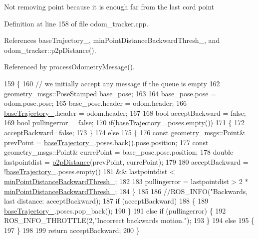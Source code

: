 Not removing point because it is enough far from the last cord point 

Definition at line 158 of file odom\+\_\+tracker.\+cpp.



References base\+Trajectory\+\_\+, min\+Point\+Distance\+Backward\+Thresh\+\_\+, and odom\+\_\+tracker\+::p2p\+Distance().



Referenced by process\+Odometry\+Message().


\begin{DoxyCode}
159 \{
160     \textcolor{comment}{// we initially accept any message if the queue is empty   }
162 \textcolor{comment}{}    geometry\_msgs::PoseStamped base\_pose;
163     
164     base\_pose.pose = odom.pose.pose;
165     base\_pose.header = odom.header;
166     \hyperlink{classodom__tracker_1_1OdomTracker_a889adca220c33056d9a582eceda64adc}{baseTrajectory\_}.header = odom.header;
167 
168     \textcolor{keywordtype}{bool} acceptBackward = \textcolor{keyword}{false};
169     \textcolor{keywordtype}{bool} pullingerror = \textcolor{keyword}{false};
170     \textcolor{keywordflow}{if}(\hyperlink{classodom__tracker_1_1OdomTracker_a889adca220c33056d9a582eceda64adc}{baseTrajectory\_}.poses.empty())
171     \{
172         acceptBackward=\textcolor{keyword}{false};
173     \}
174     \textcolor{keywordflow}{else}
175     \{
176         \textcolor{keyword}{const} geometry\_msgs::Point& prevPoint = \hyperlink{classodom__tracker_1_1OdomTracker_a889adca220c33056d9a582eceda64adc}{baseTrajectory\_}.poses.back().pose.position;
177         \textcolor{keyword}{const} geometry\_msgs::Point& currePoint = base\_pose.pose.position;
178         \textcolor{keywordtype}{double} lastpointdist = \hyperlink{namespaceodom__tracker_a18caccd20c7915e29706a95860e34cca}{p2pDistance}(prevPoint, currePoint);
179         
180         acceptBackward = !\hyperlink{classodom__tracker_1_1OdomTracker_a889adca220c33056d9a582eceda64adc}{baseTrajectory\_}.poses.empty() 
181                         && lastpointdist < \hyperlink{classodom__tracker_1_1OdomTracker_ae168f975b648874e7f00c2431683b3b1}{minPointDistanceBackwardThresh\_};
182 
183         pullingerror = lastpointdist > 2 * \hyperlink{classodom__tracker_1_1OdomTracker_ae168f975b648874e7f00c2431683b3b1}{minPointDistanceBackwardThresh\_};
184     \}
185 
186     \textcolor{comment}{//ROS\_INFO("Backwards, last distance: %
       acceptBackward);}
187     \textcolor{keywordflow}{if} (acceptBackward) 
188     \{
189         \hyperlink{classodom__tracker_1_1OdomTracker_a889adca220c33056d9a582eceda64adc}{baseTrajectory\_}.poses.pop\_back();
190     \} 
191     \textcolor{keywordflow}{else} \textcolor{keywordflow}{if} (pullingerror) \{
192         ROS\_INFO\_THROTTLE(2,\textcolor{stringliteral}{"Incorrect backwards motion."});
193     \} 
194     \textcolor{keywordflow}{else} 
195     \{
197     \}
198 
199     \textcolor{keywordflow}{return} acceptBackward;
200 \}
\end{DoxyCode}


